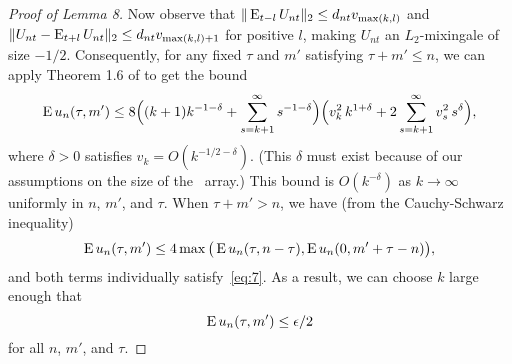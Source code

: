 \documentclass[11pt]{article}
\begin{document}
{\begin{proof}[Proof of Lemma 8]
  Now observe that $\| \operatorname{E}_{t-l} U_{nt} \|_2 \leq d_{nt} v_{\max(k,l)}$
  and $\| U_{nt} - \operatorname{E}_{t+l} U_{nt} \|_2 \leq d_{nt} v_{\max(k,l)+1}$
  for positive $l$, making $U_{nt}$ an $L_2$-mixingale of size $-1/2$.
  Consequently, for any fixed $\tau$ and $m'$ satisfying $\tau + m'
  \leq n$, we can apply Theorem 1.6 of \cite{Mcl:75} to get the bound
  \begin{equation}\label{eq:7}
    \operatorname{E} u_n(\tau, m') \leq
    8 \Big((k + 1) k^{-1-\delta} + \sum_{s=k+1}^\infty s^{-1-\delta}\Big)
    \Big(v_k^2 \, k^{1+\delta} + 2 \sum_{s=k+1}^\infty v_s^2 \, s^\delta\Big),
  \end{equation}
  where $\delta > 0$ satisfies $v_k = O(k^{-1/2 - \delta})$. (This
  $\delta$ must exist because of our assumptions on the size of the
  \ned\ array.) This bound is $O(k^{-\delta})$ as $k \to \infty$
  uniformly in $n$, $m'$, and $\tau$.
  When $\tau + m' > n$, we have (from the Cauchy-Schwarz inequality)
  \begin{equation*}
    \operatorname{E} u_n(\tau, m') \leq
    4 \max\big( \operatorname{E} u_n(\tau, n - \tau),
                \operatorname{E} u_n(0, m' + \tau - n) \big),
  \end{equation*}
  and both terms individually satisfy~\eqref{eq:7}. As a result, we
  can choose $k$ large enough that
  \begin{equation*}
    \operatorname{E} u_n(\tau, m') \leq \epsilon/2
  \end{equation*}
  for all $n$, $m'$, and $\tau$.


\end{proof}}
\end{document}
